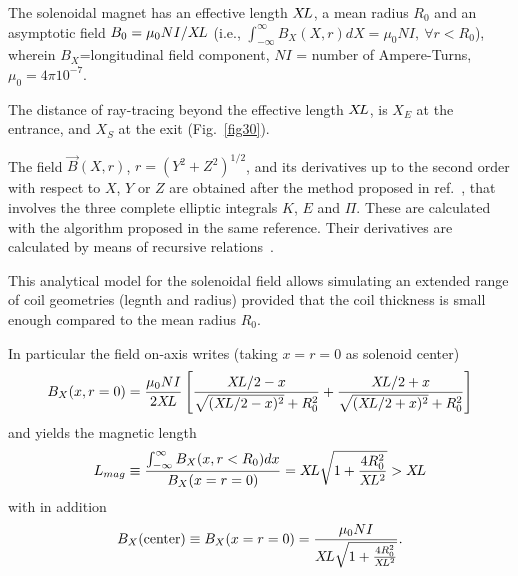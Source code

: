  The solenoidal magnet has an effective length $ X\!L$,  a mean radius
$ R_0 $ and an asymptotic field  $ B_0=\mu_0 N I / X\!L$ (i.e., $\int_{-\infty}^\infty 
B_X(X,r) dX = \mu_0 N I, ~\forall r<R_0$), wherein $B_X$=longitudinal field component, 
$ NI $  = number of Ampere-Turns, $\mu_0=4\pi  10^{-7} $. 
\medskip

\noindent The distance of ray-tracing beyond the effective length $ X\!L$,   is 
$X_E $ at the entrance, and $ X_S $ at the exit (Fig.~\ref{fig30}).   
\medskip

\noindent The field $ \vec  B(X,r)$, $r=(Y^2+Z^2)^{1/2} $, and its derivatives
up to the second order with respect to $ X$, $Y $ or $ Z $ are obtained after 
the method proposed in ref.~\cite{Biblio17}, %
that involves the three complete elliptic integrals $K$, $E $ and $\Pi$. These 
are calculated with the algorithm proposed in the same reference. Their 
derivatives are calculated by means of recursive relations~\cite{Biblio18}.  %
\medskip

\noindent This analytical model for the solenoidal field allows simulating an 
extended range of coil geometries (legnth and radius) 
provided that the coil thickness is small enough compared to the mean radius $ R_0 $. 
\medskip


\noindent In particular the field on-axis writes (taking $x=r=0$ as solenoid center) 
$$B_X(x,r=0) = \frac{\mu_0 N I }{2 X\!L} \left[ \frac{X\!L/2-x}{\sqrt{(X\!L/2-x)^2}+R_0^2} 
+  \frac{X\!L/2+x}{\sqrt{(X\!L/2+x)^2}+R_0^2} \right]$$ 
 and yields the magnetic length 
$$L_{mag} \equiv  \frac{\int_{-\infty}^\infty B_X(x,r<R_0) dx }{B_X(x=r=0)} 
= X\!L\sqrt{1+\frac{4R_0^2 }{X\!L^2}} > X\!L $$ 
with in addition 
$$B_X(\textrm{center}) \equiv B_X(x=r=0) = 
      \frac{\mu_0 N I }{X\!L\sqrt{1+\frac{4R_0^2}{X\!L^2}}}.$$
\vfill

